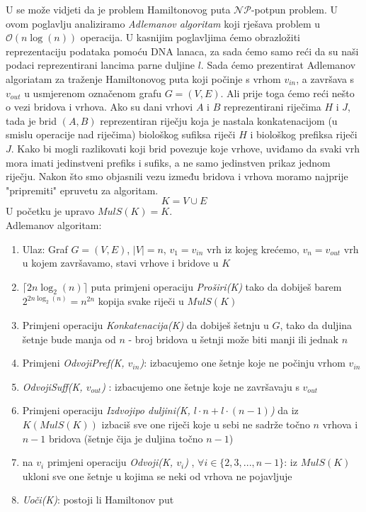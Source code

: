 \documentclass[12pt, a4paper]{book}
\begin{document}
\begin{spacing}{1.5}
U \cite[str. ~286-291]{Sipser} se može vidjeti da je problem Hamiltonovog puta $\mathcal{NP}$-potpun problem. U ovom poglavlju analiziramo \textit{Adlemanov algoritam} koji rješava problem u $\mathcal{O}(n \log (n))$ operacija. U kasnijim poglavljima ćemo obrazložiti reprezentaciju podataka pomoću DNA lanaca, za sada ćemo samo reći da su naši podaci reprezentirani lancima parne duljine $l$. Sada ćemo prezentirat Adlemanov algoriatam za traženje Hamiltonovog puta koji počinje s vrhom $v_{in}$, a završava s $v_{out}$ u usmjerenom označenom grafu $G=(V,E)$. Ali prije toga ćemo reći nešto o vezi bridova i vrhova. Ako su dani vrhovi $A$ i $B$ reprezentirani riječima $H$ i $J$, tada je brid $(A,B)$ reprezentiran riječju koja je nastala konkatenacijom (u smislu operacije nad riječima) biološkog sufiksa riječi $H$ i biološkog prefiksa riječi $J$. Kako bi mogli razlikovati koji brid povezuje koje vrhove, uviđamo da svaki vrh mora imati jedinstveni prefiks i sufiks, a ne samo jedinstven prikaz jednom riječju. 
    Nakon što smo objasnili vezu između bridova i vrhova moramo najprije "pripremiti" epruvetu za algoritam. \[K=V\cup E\]
    U početku je upravo $MulS(K)=K$.\\
    \indent Adlemanov algoritam:
    \begin{enumerate}
        \item Ulaz: Graf $G=(V,E)$, $|V|=n$, $v_1=v_{in}$ vrh iz kojeg krećemo, $v_n=v_{out}$ vrh u kojem završavamo, stavi vrhove i bridove u $K$
        \item $ \lceil 2n\log_{2}(n) \rceil$ puta primjeni operaciju \textit{Proširi(K)} tako da dobiješ barem $2^{2n\log_{2}(n)}=n^{2n}$ kopija svake riječi u $MulS(K)$
        \item Primjeni operaciju \textit{Konkatenacija(K)} da dobiješ šetnju u $G$, tako da duljina šetnje bude manja od $n$ - broj bridova u šetnji može biti manji ili jednak $n$
        \item Primjeni \textit{Odvoji\textunderscore Pref(K, $v_{in}$)}: izbacujemo one šetnje koje ne počinju vrhom $v_{in}$
        \item  \textit{Odvoji\textunderscore Suff(K, $v_{out}$)} : izbacujemo one šetnje koje ne završavaju s $v_{out}$
        \item Primjeni operaciju \textit{Izdvoji\textunderscore po \textunderscore duljini(K, $l\cdot n + l\cdot (n-1) $)} da iz $K (MulS(K))$ izbaciš sve one riječi koje u sebi ne sadrže točno $n$ vrhova i $n-1$ bridova (šetnje čija je duljina točno $n-1$)
        \item na $v_i$ primjeni operaciju \textit{Odvoji(K, $v_i$)} , $\forall{i} \in \{2,3,...,n-1\}$: iz $MulS(K)$ ukloni sve one šetnje u kojima se neki od vrhova ne pojavljuje
        \item \textit{Uoči(K)}: postoji li Hamiltonov put
    \end{enumerate}



\end{spacing}
\end{document}
